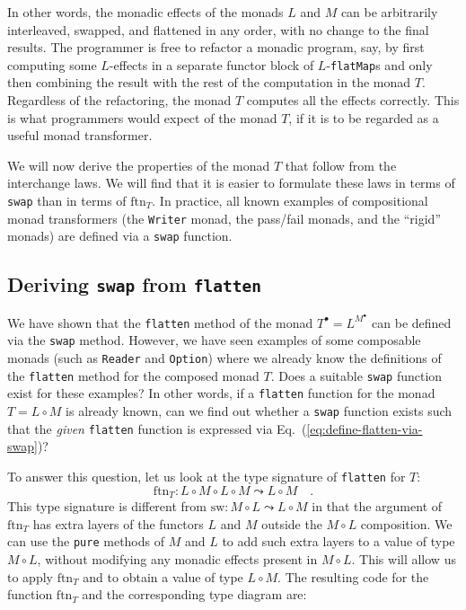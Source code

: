 In other words, the monadic effects of the monads $L$ and $M$ can
be arbitrarily interleaved, swapped, and flattened in any order, with
no change to the final results. The programmer is free to refactor
a monadic program, say, by first computing some $L$-effects in a
separate functor block of $L$-\lstinline!flatMap!s and only then
combining the result with the rest of the computation in the monad
$T$. Regardless of the refactoring, the monad $T$ computes all the
effects correctly. This is what programmers would expect of the monad
$T$, if it is to be regarded as a useful monad transformer.

We will now derive the properties of the monad $T$ that follow from
the interchange laws. We will find that it is easier to formulate
these laws in terms of \lstinline!swap! than in terms of $\text{ftn}_{T}$.
In practice, all known examples of compositional monad transformers
(the \lstinline!Writer! monad, the pass/fail monads, and the \textsf{``}rigid\textsf{''}
monads) are defined via a \lstinline!swap! function.

\subsection{Deriving \texttt{swap} from \texttt{flatten}\label{subsec:Deriving-swap-from-flatten}}

We have shown that the \texttt{}\lstinline!flatten! method of the
monad $T^{\bullet}=L^{M^{\bullet}}$ can be defined via the \texttt{}\lstinline!swap!
method. However, we have seen examples of some composable monads (such
as \texttt{}\lstinline!Reader! and \lstinline!Option!) where we
already know the definitions of the \texttt{}\lstinline!flatten!
method for the composed monad $T$. Does a suitable \texttt{}\lstinline!swap!
function exist for these examples? In other words, if a \texttt{}\lstinline!flatten!
function for the monad $T=L\circ M$ is already known, can we find
out whether a \texttt{}\lstinline!swap! function exists such that
the\emph{ given} \texttt{}\lstinline!flatten! function is expressed
via Eq.~(\ref{eq:define-flatten-via-swap})? 

To answer this question, let us look at the type signature of \texttt{}\lstinline!flatten!
for $T$:
\[
\text{ftn}_{T}:L\circ M\circ L\circ M\leadsto L\circ M\quad.
\]
This type signature is different from $\text{sw}:M\circ L\leadsto L\circ M$
in that the argument of $\text{ftn}_{T}$ has extra layers of the
functors $L$ and $M$ outside the $M\circ L$ composition. We can
use the \lstinline!pure! methods of $M$ and $L$ to add such extra
layers to a value of type $M\circ L$, without modifying any monadic
effects present in $M\circ L$. This will allow us to apply $\text{ftn}_{T}$
and to obtain a value of type $L\circ M$. The resulting code for
the function $\text{ftn}_{T}$ and the corresponding type diagram
are:%
\begin{comment}
precarious formatting
\end{comment}

